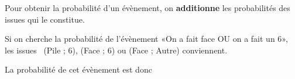 \documentclass[noheader]{coursclass}
\begin{document}
\begin{propriete}
	Pour obtenir la probabilité d'un évènement, on \textbf{additionne} les probabilités des issues qui le constitue.
\end{propriete}

\begin{exemple}
	Si on cherche la probabilité de l'évènement «On a fait face OU on a fait un $6$», les issues \ (Pile ; $6$), (Face ; $6$) ou (Face ; Autre) conviennent.

	La probabilité de cet évènement est donc 
\end{exemple}
\end{document}
